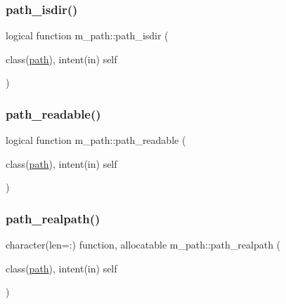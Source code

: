 \mbox{\label{namespacem__path_a4e56f4f3db67378cb4f20340a14f4a0f}} 
\subsubsection{\texorpdfstring{path\+\_\+isdir()}{path\_isdir()}}
{\footnotesize\ttfamily logical function m\+\_\+path\+::path\+\_\+isdir (\begin{DoxyParamCaption}\item[{class(\mbox{\hyperlink{structm__path_1_1path}{path}}), intent(in)}]{self }\end{DoxyParamCaption})\hspace{0.3cm}{\ttfamily [private]}}

\mbox{\label{namespacem__path_a9e5b51fcb0d98f8a711b9bfbcaa39c66}} 
\subsubsection{\texorpdfstring{path\+\_\+readable()}{path\_readable()}}
{\footnotesize\ttfamily logical function m\+\_\+path\+::path\+\_\+readable (\begin{DoxyParamCaption}\item[{class(\mbox{\hyperlink{structm__path_1_1path}{path}}), intent(in)}]{self }\end{DoxyParamCaption})\hspace{0.3cm}{\ttfamily [private]}}

\mbox{\label{namespacem__path_a54bcb3564054f6540a65dc32354f2a2d}} 
\subsubsection{\texorpdfstring{path\+\_\+realpath()}{path\_realpath()}}
{\footnotesize\ttfamily character(len=\+:) function, allocatable m\+\_\+path\+::path\+\_\+realpath (\begin{DoxyParamCaption}\item[{class(\mbox{\hyperlink{structm__path_1_1path}{path}}), intent(in)}]{self }\end{DoxyParamCaption})\hspace{0.3cm}{\ttfamily [private]}}

